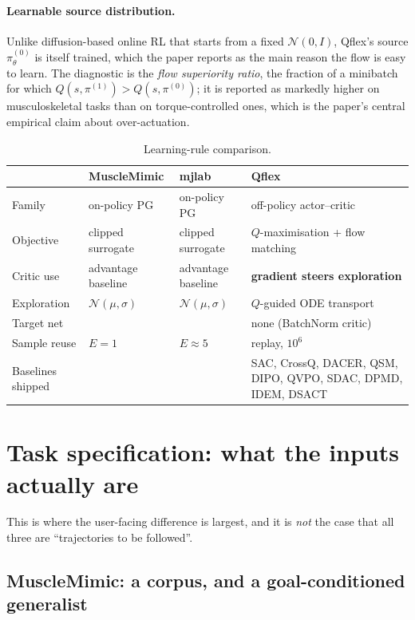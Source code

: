 \documentclass[11pt,a4paper]{article}
\newcommand{\na}{\textemdash}
\begin{document}
\paragraph{Learnable source distribution.} Unlike diffusion-based online RL that starts
from a fixed $\mathcal{N}(0,I)$, Qflex's source $\pi^{(0)}_\theta$ is itself trained,
which the paper reports as the main reason the flow is easy to learn. The diagnostic is
the \emph{flow superiority ratio}, the fraction of a minibatch for which
$Q(s,\pi^{(1)}) > Q(s,\pi^{(0)})$; it is reported as markedly higher on musculoskeletal
tasks than on torque-controlled ones, which is the paper's central empirical claim about
over-actuation.

\begin{table}[h!]
\centering
\small
\begin{tabular}{@{}lL{3.0cm}L{3.0cm}L{3.8cm}@{}}
\toprule
 & \textcolor{mmC}{MuscleMimic} & \textcolor{mjC}{mjlab} & \textcolor{qfC}{Qflex} \\
\midrule
Family        & on-policy PG & on-policy PG & off-policy actor--critic \\
Objective     & clipped surrogate & clipped surrogate & $Q$-maximisation + flow matching \\
Critic use    & advantage baseline & advantage baseline & \textbf{gradient steers exploration} \\
Exploration   & $\mathcal{N}(\mu,\sigma)$ & $\mathcal{N}(\mu,\sigma)$ & $Q$-guided ODE transport \\
Target net    & \na & \na & none (BatchNorm critic) \\
Sample reuse  & $E{=}1$ & $E{\approx}5$ & replay, $10^6$ \\
Baselines shipped & \na & \na & SAC, CrossQ, DACER, QSM, DIPO, QVPO, SDAC, DPMD, IDEM, DSACT \\
\bottomrule
\end{tabular}
\caption{Learning-rule comparison.}
\end{table}

\section{Task specification: what the inputs actually are}

This is where the user-facing difference is largest, and it is \emph{not} the case that
all three are ``trajectories to be followed''.

\subsection{MuscleMimic: a corpus, and a goal-conditioned generalist}
\end{document}
